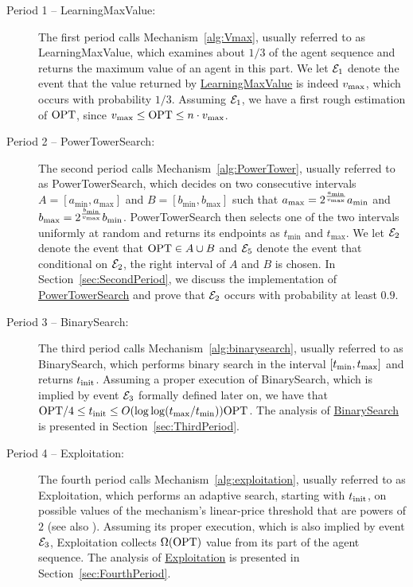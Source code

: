 \begin{description}
\item [Period 1 -- LearningMaxValue:] The first period calls Mechanism~\ref{alg:Vmax}, usually referred to as LearningMaxValue, which 
examines about $1/3$ of the agent sequence and returns the maximum value of an agent in this part. We let $\mathcal{E}_1$ denote the event that the value returned by \hyperref[alg:Vmax]{LearningMaxValue} is indeed $v_{\text{max}}$, which occurs with probability $1/3$. Assuming $\mathcal{E}_1$, we have a first rough estimation of $\mathrm{OPT}$, since $v_{\text{max}} \leq \mathrm{OPT} \leq n\cdot v_{\text{max}}$. 

\item [Period 2 -- PowerTowerSearch:] The second period calls Mechanism~\ref{alg:PowerTower}, usually referred to as PowerTowerSearch,
which decides on two consecutive intervals $A = [a_{\min}, a_{\max}]$ and $B = [b_{\min}, b_{\max}]$ such that $a_{\max} = 2^{\frac{a_{\min}}{v_{\text{max}}}}a_{\min}$ and $b_{\max} = 2^{\frac{b_{\min}}{v_{\text{max}}}}b_{\min}$. PowerTowerSearch then selects one of the two intervals uniformly at random and returns its endpoints as $t_{\min}$ and $t_{\max}$. We let $\mathcal{E}_2$ denote the event that $\mathrm{OPT} \in A \cup B$ and $\mathcal{E}_5$ denote the event that conditional on $\mathcal{E}_2$, the right interval of $A$ and $B$ is chosen. 
In Section~\ref{sec:SecondPeriod}, we discuss the implementation of \hyperref[alg:PowerTower]{PowerTowerSearch} and prove that $\mathcal{E}_2$ occurs with probability at least $0.9$. 

\item [Period 3 -- BinarySearch:] The third period calls Mechanism~\ref{alg:binarysearch}, usually referred to as BinarySearch, which performs binary search in the interval $[t_{\min}, t_{\max}]$ and returns $t_{\text{init}}$. Assuming a proper execution of BinarySearch, which is implied by event $\mathcal{E}_3$ formally defined later on, we have that $\mathrm{OPT} / 4 \leq t_{\text{init}} \leq O(\log\log(t_{\max}/t_{\min}))\mathrm{OPT}$. The analysis of \hyperref[alg:binarysearch]{BinarySearch} is presented in Section~\ref{sec:ThirdPeriod}.

\item [Period 4 -- Exploitation:] The fourth period calls Mechanism~\ref{alg:exploitation}, usually referred to as Exploitation, which performs an adaptive search, starting with $t_{\text{init}}$, on possible values of the mechanism's linear-price threshold that are powers of $2$ (see also \cite[Section~3]{Bada2012}). Assuming its proper execution, which is also implied by event $\mathcal{E}_3$, Exploitation collects $\Omega(\mathrm{OPT})$ value from its part of the agent sequence. The analysis of \hyperref[alg:exploitation]{Exploitation} is presented in Section~\ref{sec:FourthPeriod}.
\end{description}

